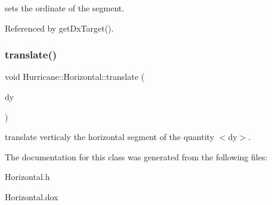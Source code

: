 sets the ordinate of the segment. 

Referenced by get\+Dx\+Target().

\mbox{\label{classHurricane_1_1Horizontal_a3d01a89cb24cdb29dda86ac9910c7530}} 
\subsubsection{\texorpdfstring{translate()}{translate()}}
{\footnotesize\ttfamily void Hurricane\+::\+Horizontal\+::translate (\begin{DoxyParamCaption}\item[{const \hyperlink{group__DbUGroup_ga4fbfa3e8c89347af76c9628ea06c4146}{Db\+U\+::\+Unit} \&}]{dy }\end{DoxyParamCaption})}

translate verticaly the horizontal segment of the quantity {\ttfamily $<$dy$>$}. 

The documentation for this class was generated from the following files\+:\begin{DoxyCompactItemize}
\item 
Horizontal.\+h\item 
Horizontal.\+dox\end{DoxyCompactItemize}
